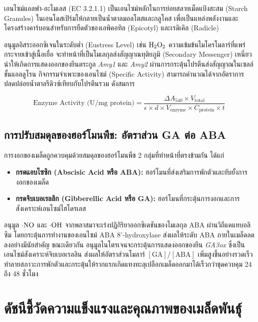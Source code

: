 เอนไซม์แอลฟา-อะไมเลส (EC 3.2.1.1) เป็นเอนไซม์หลักในการย่อยสลายเม็ดแป้งสะสม (Starch Granules) ในเอนโดสเปิร์มให้กลายเป็นน้ำตาลมอลโตสและกลูโคส เพื่อเป็นแหล่งพลังงานและโครงสร้างคาร์บอนสำหรับการยืดตัวของเอพิคอทิล (Epicotyl) และเรดิเคิล (Radicle) 

อนุมูลอิสระออกซิเจนในระดับต่ำ (Eustress Level) เช่น $\ce{H2O2}$ ความเข้มข้นไมโครโมลาร์ที่แพร่กระจายเข้าสู่เนื้อเยื่อ จะทำหน้าที่เป็นโมเลกุลส่งสัญญาณทุติยภูมิ (Secondary Messenger) เหนี่ยวนำให้เกิดการแสดงออกของยีนตระกูล \textit{Amy1} และ \textit{Amy2} ผ่านการกระตุ้นโปรตีนส่งสัญญาณในเซลล์ชั้นแอลลูโรน กิจกรรมจำเพาะของเอนไซม์ (Specific Activity) สามารถคำนวณได้จากอัตราการปลดปล่อยน้ำตาลรีดิวซ์เทียบกับโปรตีนรวม ดังสมการ

\begin{equation}
    \text{Enzyme Activity (U/mg protein)} = \frac{\Delta A_{540} \times V_{\text{total}}}{\epsilon \times d \times V_{\text{enzyme}} \times C_{\text{protein}} \times t}
    \label{eq:enzyme_activity}
\end{equation}

\subsection{การปรับสมดุลของฮอร์โมนพืช: อัตราส่วน GA ต่อ ABA}

การงอกของเมล็ดถูกควบคุมด้วยสมดุลของฮอร์โมนพืช 2 กลุ่มที่ทำหน้าที่ตรงข้ามกัน ได้แก่
\begin{itemize}
    \item \textbf{กรดแอบไซซิก (Abscisic Acid หรือ ABA):} ฮอร์โมนที่ส่งเสริมการพักตัวและยับยั้งการงอกของเมล็ด
    \item \textbf{กรดจิบเบอเรลลิก (Gibberellic Acid หรือ GA):} ฮอร์โมนที่กระตุ้นการงอกและการสังเคราะห์เอนไซม์ไฮโดรเลส
\end{itemize}

อนุมูล $\cdot\ce{NO}$ และ $\cdot\ce{OH}$ จากพลาสมาจะเร่งปฏิกิริยาออกซิเดชันของโมเลกุล ABA ผ่านวิถีแคแทบอลิซึม โดยกระตุ้นการทำงานของเอนไซม์ ABA 8'-hydroxylase ส่งผลให้ระดับ ABA ภายในเมล็ดลดลงอย่างมีนัยสำคัญ ขณะเดียวกัน อนุมูลไนโตรเจนจะกระตุ้นการแสดงออกของยีน \textit{GA3ox} ซึ่งเป็นเอนไซม์สังเคราะห์จิบเบอเรลลิน ส่งผลให้อัตราส่วนโมลาร์ $[\text{GA}]/[\text{ABA}]$ เพิ่มสูงขึ้นอย่างรวดเร็ว ทำลายสภาวะการพักตัวและกระตุ้นให้รากแรกเกิดแทงทะลุเปลือกเมล็ดออกมาได้เร็วกว่าชุดควบคุม 24 ถึง 48 ชั่วโมง

\section{ดัชนีชี้วัดความแข็งแรงและคุณภาพของเมล็ดพันธุ์}

